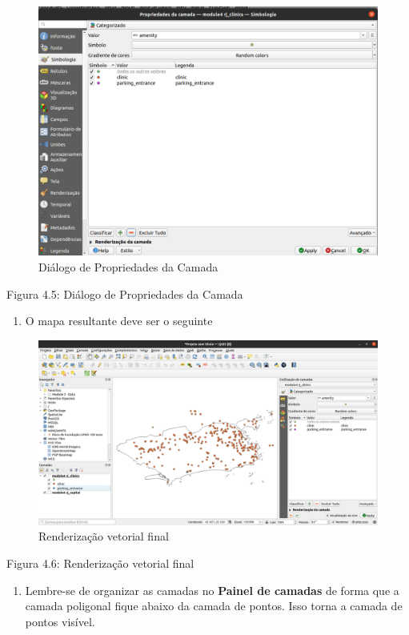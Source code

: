 \documentclass[
]{krantz}
\providecommand{\tightlist}{%
  \setlength{\itemsep}{0pt}\setlength{\parskip}{0pt}}
\begin{document}
\begin{figure}
\centering
\includegraphics{media/modulo4/vector-style.png}
\caption{Diálogo de Propriedades da Camada}
\end{figure}

Figura 4.5: Diálogo de Propriedades da Camada

\begin{enumerate}
\def\labelenumi{\arabic{enumi}.}
\setcounter{enumi}{9}
\tightlist
\item
  O mapa resultante deve ser o seguinte
\end{enumerate}

\begin{figure}
\centering
\includegraphics{media/modulo4/final-vector-render.png}
\caption{Renderização vetorial final}
\end{figure}

Figura 4.6: Renderização vetorial final

\begin{enumerate}
\def\labelenumi{\arabic{enumi}.}
\setcounter{enumi}{10}
\tightlist
\item
  Lembre-se de organizar as camadas no \textbf{Painel de camadas} de forma que a camada poligonal fique abaixo da camada de pontos. Isso torna a camada de pontos visível.
\end{enumerate}
\end{document}
